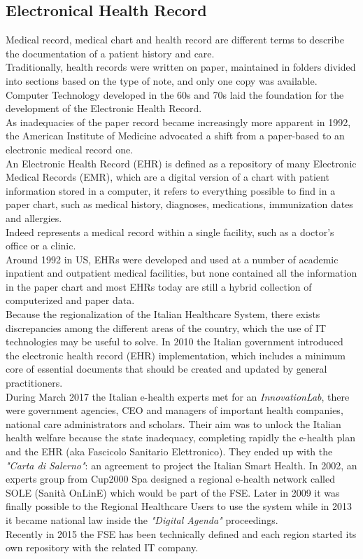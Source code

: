 \subsection{Electronical Health Record}
Medical record, medical chart and health record are different terms to describe the documentation of a patient history and care.\\
Traditionally, health records were written on paper, maintained in folders divided into sections based on the type of note, and only one copy was available.
Computer Technology developed in the 60s and 70s laid the foundation for the development of the Electronic Health Record.\\
As inadequacies of the paper record became increasingly more apparent in 1992, the American Institute of Medicine advocated a shift from a paper-based to an electronic medical record one.\cite{Evans2016ElectronicHR}\\
An Electronic Health Record (EHR) is defined as a repository of many Electronic Medical Records (EMR), which are a digital version of a chart with patient information stored in a computer, it refers to everything possible to find in a paper chart, such as medical history, diagnoses, medications, immunization dates and allergies.\cite{emr}\\
Indeed represents a medical record within a single facility, such as a doctor's office or a clinic.\\
Around 1992 in US, EHRs were developed and used at a number of academic inpatient and outpatient medical facilities, but none contained all the information in the paper chart and most EHRs today are still a hybrid collection of computerized and paper data.
\cite{Evans2016ElectronicHR}\\
Because the regionalization of the Italian Healthcare System, there exists discrepancies among the different areas of the country, which the use of IT technologies may be useful to solve. In 2010 the Italian government introduced the electronic health record (EHR) implementation, which includes a minimum core of essential documents that should be created and updated by general practitioners.\\
During March 2017 the Italian e-health experts met for an \textit{InnovationLab}, there were government agencies, CEO and managers of important health companies, national care administrators and scholars. Their aim was to unlock the Italian health welfare because the state inadequacy, completing rapidly the e-health plan and the EHR (aka Fascicolo Sanitario Elettronico). They ended up with the \textit{"Carta di Salerno"}: an agreement to project the Italian Smart Health.
In 2002, an experts group from Cup2000 Spa designed a regional e-health network called SOLE (Sanità OnLinE) which would be part of the FSE. Later in 2009 it was finally possible to the Regional Healthcare Users to use the system while in 2013 it became national law inside the \textit{"Digital Agenda"} proceedings.\\
Recently in 2015 the FSE has been technically defined and each region started its own repository with the related IT company.
\cite{smarthealth}
